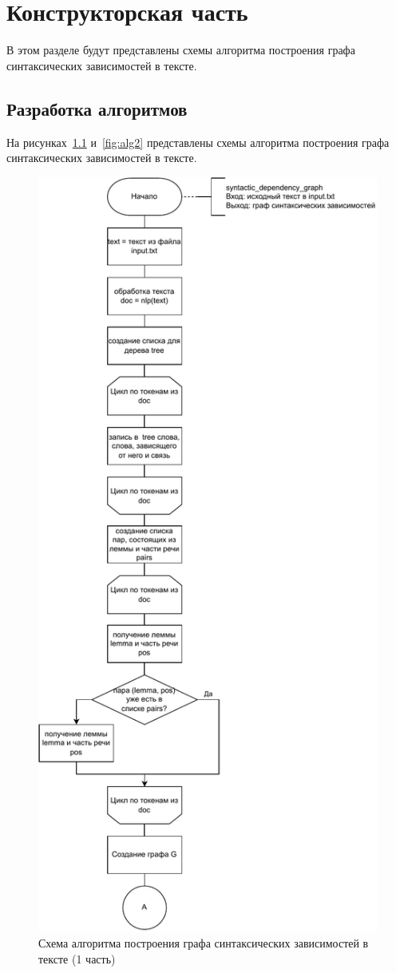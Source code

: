 \chapter{Конструкторская часть}
В этом разделе будут представлены схемы алгоритма построения графа синтаксических зависимостей в тексте.


\section{Разработка алгоритмов}

На рисунках~\ref{fig:alg} и~\ref{fig:alg2} представлены схемы алгоритма построения графа синтаксических зависимостей в тексте.

\begin{figure}[h!]
	\centering
	\includegraphics[width=0.65\linewidth]{img/alg}
	\caption{Схема алгоритма построения графа синтаксических зависимостей в тексте (1 часть)}
	\label{fig:alg}
\end{figure}

